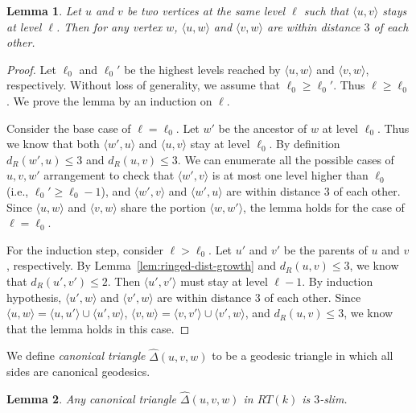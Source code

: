 \documentclass[11pt]{article}
\newtheorem{lem}{Lemma}
\begin{document}
\begin{lem} \label{lem:smallcan}
Let $u$ and $v$ be two vertices at the same level $\ell$ such that 
	$\langle u,v\rangle$ stays at level $\ell$.
Then for any vertex $w$, $\langle u,w\rangle$ and 
	$\langle v, w\rangle$ are within distance $3$ of each other.
\end{lem}
\begin{proof}
Let $\ell_0$ and $\ell_0'$ be the highest levels reached by
	$\langle u,w\rangle$ and $\langle v, w\rangle$, respectively.
Without loss of generality, we assume that $\ell_0 \ge \ell_0'$.
Thus $\ell \ge \ell_0$.
We prove the lemma by an induction on $\ell$.

Consider the base case of $\ell = \ell_0$.
Let $w'$ be the ancestor of $w$ at level $\ell_0$.
Thus we know that both $\langle w', u\rangle$ and $\langle u,v\rangle$
	stay at level $\ell_0$.
By definition $d_R(w',u)\le 3$ and $d_R(u,v)\le 3$.
We can enumerate all the possible cases of $u,v,w'$ arrangement to check
	that $\langle w', v \rangle$ is at most one level higher than
	$\ell_0$ (i.e., $\ell_0' \ge \ell_0 -1 $), and $\langle w', v \rangle$ and
	$\langle w', u\rangle$ are within distance $3$ of each other.
Since $\langle u,w\rangle$ and $\langle v, w\rangle$ share the portion
	$\langle w, w'\rangle$, the lemma holds for the case of $\ell=\ell_0$.

For the induction step, consider $\ell > \ell_0$.
Let $u'$ and $v'$ be the parents of $u$ and $v$, respectively.
By Lemma~\ref{lem:ringed-dist-growth} and $d_R(u,v)\le 3$, we know that
	$d_R(u',v') \le 2$.
Then $\langle u',v' \rangle$ must stay at level $\ell-1$.
By induction hypothesis, $\langle u',w \rangle$ and $\langle v',w \rangle$
	are within distance $3$ of each other.
Since $\langle u,w \rangle = \langle u,u' \rangle \cup
	\langle u',w \rangle$, $\langle v,w \rangle = \langle v,v' \rangle \cup
	\langle v',w \rangle$, and $d_R(u,v)\le 3$, we know that the 
	lemma holds in this case.
\end{proof}

We define {\em canonical triangle} $\hat{\Delta}(u,v,w)$ to be 
	a geodesic triangle in which all sides are canonical geodesics. 

\begin{lem}\label{lem:canonical-geodesic-triangle-thin}
Any canonical triangle $ \hat{\Delta}(u,v,w)$ in $RT(k)$ is $3$-slim.
\end{lem}
\end{document}
